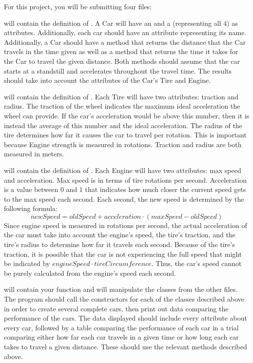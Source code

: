 \documentclass[11pt]{cselabheader}
\begin{document}
\begin{ex}
  For this project, you will be submitting four files:

   will contain the definition of . A
  Car will have an  and a   (representing all 4)
  as attributes. Additionally, each car should have an attribute representing its name.
  Additionally, a Car should have a method  that returns
  the distance that the Car travels in the time given as well as a method
   that returns the time it takes for the Car to travel
  the given distance. Both methods should assume that
  the car starts at a standstill and accelerates throughout the travel time. The results
  should take into account the attributes of the Car's Tire and Engine.
  
   will contain the definition of . Each Tire
  will have two attributes: traction and radius. The traction of the wheel indicates the
  maximum ideal acceleration the wheel can provide. If the car's acceleration would be
  above this number, then it is instead the average of this number and the
  ideal acceleration. The radius of the tire determines how far it causes the
  car to travel per rotation. This is important because Engine strength is
  measured in rotations. Traction and radius are both measured in meters.
  
   will contain the definition of
  . Each Engine will have two attributes:
  max speed and acceleration. Max speed is in terms of tire rotations per
  second. Acceleration is a value between $0$ and $1$ that indicates how much
  closer the current speed gets to the max speed each second. Each second, the
  new speed is determined by the following formula:
  $$newSpeed = oldSpeed + acceleration \cdot \left(maxSpeed - oldSpeed\right)$$
  Since engine speed is measured in rotations per second, the actual
  acceleration of the car must take into account the engine's speed, the tire's
  traction, and the tire's radius to determine how far it travels each second.
  Because of the tire's traction, it is possible that the car is not
  experiencing the full speed that might be indicated by
  $engineSpeed \cdot tireCircumference$. Thus, the car's speed cannot be purely
  calculated from the engine's speed each second.

   will contain your  function and will
  manipulate the classes from the other files. The program should call the
  constructors for each of the classes described above in order to create
  several complete cars, then print out data comparing the performance of the
  cars. The data displayed should include every attribute about every car,
  followed by a table comparing the performance of each car in a trial
  comparing either how far each car travels in a given time or how long each
  car takes to travel a given distance. These should use the relevant methods
  described above.
  

\end{ex}
\end{document}
